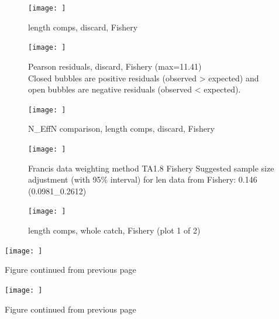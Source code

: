 \documentclass[12pt,]{article}
\begin{document}
\FloatBarrier

\FloatBarrier

\FloatBarrier

\FloatBarrier

\FloatBarrier

\FloatBarrier

\begin{figure}
\centering
\texttt{[image: ]}
\caption{length comps, discard, Fishery \label{fig:mod1_1_}}
\end{figure}

\begin{figure}
\centering
\texttt{[image: ]}
\caption{Pearson residuals, discard, Fishery (max=11.41)\\
Closed bubbles are positive residuals (observed \textgreater{} expected)
and open bubbles are negative residuals (observed \textless{} expected).
\label{fig:mod1_2_}}
\end{figure}

\begin{figure}
\centering
\texttt{[image: ]}
\caption{N\_EffN comparison, length comps, discard, Fishery
\label{fig:mod1_3_}}
\end{figure}

\begin{figure}
\centering
\texttt{[image: ]}
\caption{Francis data weighting method TA1.8 Fishery Suggested sample
size adjustment (with 95\% interval) for len data from Fishery: 0.146
(0.0981\_0.2612) \label{fig:mod1_4_}}
\end{figure}

\begin{figure}
\centering
\texttt{[image: ]}
\caption{length comps, whole catch, Fishery (plot 1 of 2)
\label{fig:mod1_5_}}
\end{figure}

\texttt{[image: ]}

\begin{center} 

              Figure continued from previous page 

             \end{center}

\texttt{[image: ]}

\begin{center} 

              Figure continued from previous page 

             \end{center}
\end{document}
